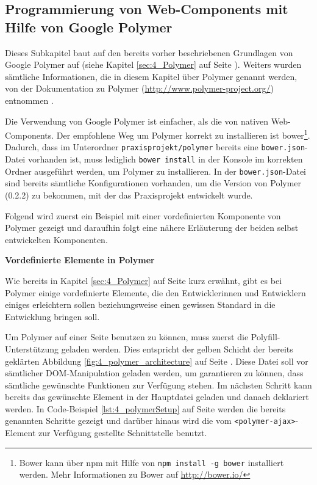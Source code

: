 \subsection{Programmierung von Web-Components mit Hilfe von Google Polymer}
\label{sec:6_WC_Polymer}

Dieses Subkapitel baut auf den bereits vorher beschriebenen Grundlagen von Google Polymer auf (siehe Kapitel \ref{sec:4_Polymer} auf Seite \pageref{sec:4_Polymer}). Weiters wurden sämtliche Informationen, die in diesem Kapitel über Polymer genannt werden, von der Dokumentation zu Polymer (\url{http://www.polymer-project.org/}) entnommen \citereset \autocite[siehe][]{Polymer}.

Die Verwendung von Google Polymer ist einfacher, als die von nativen Web-Components. Der empfohlene Weg um Polymer korrekt zu installieren ist \glqq bower\footnote{Bower kann über npm mit Hilfe von \lstinline|npm install -g bower| installiert werden. Mehr Informationen zu Bower auf \href{http://bower.io/}{http://bower.io/}}\grqq . Dadurch, dass im Unterordner \lstinline|praxisprojekt/polymer| bereits eine \lstinline|bower.json|-Datei vorhanden ist, muss lediglich \lstinline|bower install| in der Konsole im korrekten Ordner ausgeführt werden, um Polymer zu installieren. In der \lstinline|bower.json|-Datei sind bereits sämtliche Konfigurationen vorhanden, um die Version von Polymer (0.2.2) zu bekommen, mit der das Praxisprojekt entwickelt wurde.

Folgend wird zuerst ein Beispiel mit einer vordefinierten Komponente von Polymer gezeigt und daraufhin folgt eine nähere Erläuterung der beiden selbst entwickelten Komponenten.

\textbf{Vordefinierte Elemente in Polymer}

Wie bereits in Kapitel \ref{sec:4_Polymer} auf Seite \pageref{sec:4_Polymer} kurz erwähnt, gibt es bei Polymer einige vordefinierte Elemente, die den Entwicklerinnen und Entwicklern einiges erleichtern sollen beziehungsweise einen gewissen Standard in die Entwicklung bringen soll.

Um Polymer auf einer Seite benutzen zu können, muss zuerst die Polyfill-Unterstützung geladen werden. Dies entspricht der gelben Schicht der bereits geklärten Abbildung \ref{fig:4_polymer_architecture} auf Seite \pageref{fig:4_polymer_architecture}.
Diese Datei soll vor sämtlicher DOM-Manipulation geladen werden, um garantieren zu können, dass sämtliche gewünschte Funktionen zur Verfügung stehen. Im nächsten Schritt kann bereits das gewünschte Element in der Hauptdatei geladen und danach deklariert werden. In Code-Beispiel \ref{lst:4_polymerSetup} auf Seite \pageref{lst:4_polymerSetup} werden die bereits genannten Schritte gezeigt und darüber hinaus wird die vom \lstinline|<polymer-ajax>|-Element zur Verfügung gestellte Schnittstelle benutzt.

